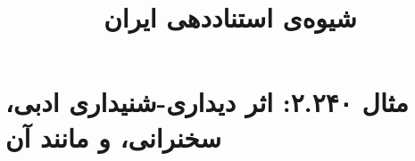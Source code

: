 \documentclass[a4paper,10pt]{article}
\begin{document}
\title{شیوه‌ی استناددهی ایران
 }
\author{}
\date{}
\maketitle



\section*{مثال ۲.۲۴۰: اثر دیداری-شنیداری ادبی، سخنرانی، و مانند آن}

\cite{پناهی1384}\\
\cite{ابتهاج}\\
\cite{auden}\\






\end{document}
